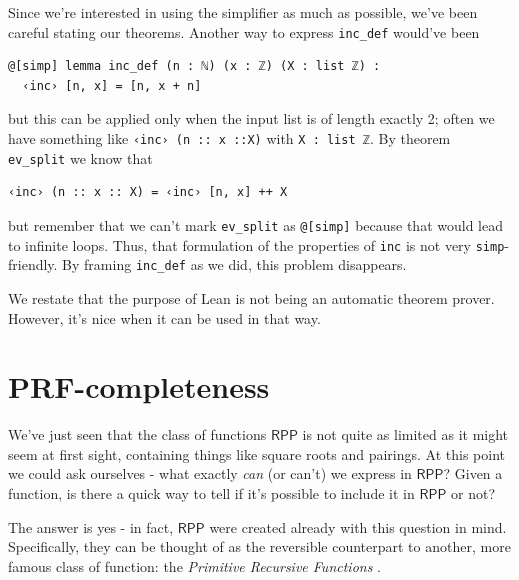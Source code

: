 \documentclass[oneside]{book}
\theoremstyle{definition}
\theoremstyle{remark}
\theoremstyle{plain}
\newcommand{\RPP}{\mathsf{RPP}}
\begin{document}
Since we're interested in using the simplifier as much as possible,
we've been careful stating our theorems.
Another way to express \lstinline{inc_def} would've been
\begin{lstlisting}
@[simp] lemma inc_def (n : ℕ) (x : ℤ) (X : list ℤ) :
  ‹inc› [n, x] = [n, x + n]
\end{lstlisting}
but this can be applied only when the input list is of length exactly 2;
often we have something like \lstinline{‹inc› (n :: x ::X)} with \lstinline{X : list ℤ}.
By theorem \lstinline{ev_split} we know that
\begin{lstlisting}
‹inc› (n :: x :: X) = ‹inc› [n, x] ++ X
\end{lstlisting}
but remember that we can't mark \lstinline{ev_split} as \lstinline{@[simp]} because
that would lead to infinite loops.
Thus, that formulation of the properties of \lstinline{inc} is not very \lstinline{simp}-friendly.
By framing \lstinline{inc_def} as we did, this problem disappears.

We restate that the purpose of Lean is not being an automatic theorem prover.
However, it's nice when it can be used in that way.

\section{PRF-completeness} \label{prfcompleteness}

We've just seen that the class of functions $\RPP$ is not quite as limited as it might seem at first sight,
containing things like square roots and pairings.
At this point we could ask ourselves - what exactly \textit{can} (or can't) we express in $\RPP$?
Given a function, is there a quick way to tell if it's possible to include it in $\RPP$ or not?

The answer is yes - in fact, $\RPP$ were created already with this question in mind.
Specifically, they can be thought of as the reversible counterpart to another,
more famous class of function: the \textit{Primitive Recursive Functions} \cite{odifreddi1989book}.
\end{document}
